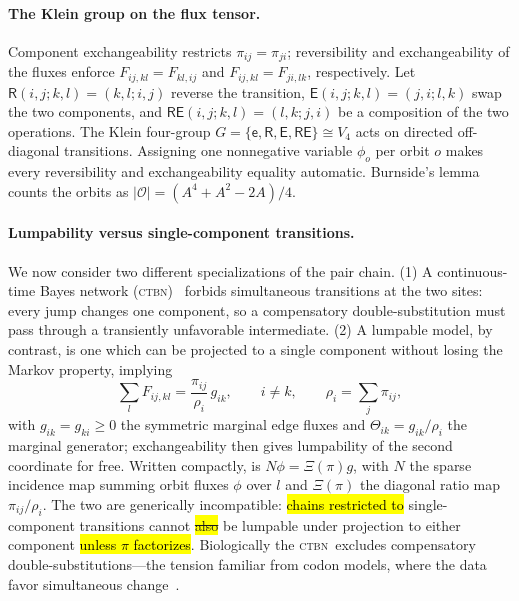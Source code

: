 \documentclass[11pt]{article}
\newcommand{\revised}[1]{\hl{#1}}   %
\newcommand{\deleted}[1]{{\setlength{\fboxsep}{0pt}\colorbox{yellow}{\vphantom{(}\st{#1}}}}
\newcommand{\CTBN}{\textsc{ctbn}}
\begin{document}
\paragraph{The Klein group on the flux tensor.} Component exchangeability
restricts $\pi_{ij}=\pi_{ji}$; reversibility and exchangeability of the fluxes
enforce $F_{ij,kl}=F_{kl,ij}$ and $F_{ij,kl}=F_{ji,lk}$, respectively. Let
$\mathsf{R}(i,j;k,l)=(k,l;i,j)$ reverse the transition, $\mathsf{E}(i,j;k,l)=(j,i;l,k)$
swap the two components, and $\mathsf{RE}(i,j;k,l) = (l,k;j,i)$ be a composition of the two operations. The Klein four-group $G=\{\mathsf{e}, \mathsf{R}, \mathsf{E}, \mathsf{RE} \}\cong V_4$
acts on directed off-diagonal transitions.
Assigning one nonnegative variable $\phi_o$ per orbit $o$ makes every reversibility and
exchangeability equality automatic. Burnside's lemma counts the orbits as
$|\mathcal O|=(A^4+A^2-2A)/4$.

\paragraph{Lumpability versus single-component transitions.} We now consider two
different specializations of the pair chain.
(1) A continuous-time Bayes network
(\CTBN)~\citep{nodelman2002,cohn2010} forbids simultaneous transitions at
the two sites: every jump changes one component, so a compensatory
double-substitution must pass through a transiently unfavorable
intermediate. (2) A lumpable model, by contrast, is one which can be projected
to a single component without losing the Markov property, implying
\begin{equation}
\label{eq:lump}
\sum_l F_{ij,kl}=\frac{\pi_{ij}}{\rho_i}\,g_{ik},\qquad i\ne k,
\qquad \rho_i=\sum_j\pi_{ij},
\end{equation}
with $g_{ik}=g_{ki}\ge0$ the symmetric marginal edge fluxes and
$\Theta_{ik}=g_{ik}/\rho_i$ the marginal generator; exchangeability then gives
lumpability of the second coordinate for free. Written compactly,
 is $N\phi=\Xi(\pi)g$, with $N$ the sparse incidence map
summing orbit fluxes $\phi$ over $l$ and $\Xi(\pi)$ the diagonal ratio map
$\pi_{ij}/\rho_i$. The two are generically incompatible: \revised{chains restricted to} single-component
transitions cannot \deleted{also} be lumpable under projection to either component \revised{unless $\pi$ factorizes}.
Biologically the \CTBN\ excludes compensatory double-substitutions---the
tension familiar from codon models, where the data favor simultaneous
change~\citep{KosiolHolmesGoldman2007}.
\end{document}
